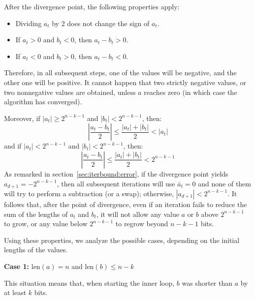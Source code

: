\documentclass{llncs}
\newcommand{\bitlength}{\text{len}}
\begin{document}
After the divergence point, the following properties apply:
\begin{itemize}

    \item Dividing $a_t$ by 2 does not change the sign of $a_t$.

    \item If $a_t > 0$ and $b_t < 0$, then $a_t - b_t > 0$.

    \item If $a_t < 0$ and $b_t > 0$, then $a_t - b_t < 0$.

\end{itemize}
Therefore, in all subsequent steps, one of the values will be negative,
and the other one will be positive. It cannot happen that two strictly
negative values, or two nonnegative values are obtained, unless $a$
reaches zero (in which case the algorithm has converged).

Moreover, if $|a_t| \geq 2^{n-k-1}$ and $|b_t| < 2^{n-k-1}$, then:
\begin{equation*}
    \left| \frac{a_t - b_t}{2} \right| \leq \frac{|a_t| + |b_t|}{2} < |a_t|
\end{equation*}
and if $|a_t| < 2^{n-k-1}$ and $|b_t| < 2^{n-k-1}$, then:
\begin{equation*}
    \left| \frac{a_t - b_t}{2} \right| \leq \frac{|a_t| + |b_t|}{2} < 2^{n-k-1}
\end{equation*}
As remarked in section~\ref{sec:iterbound:error}, if the divergence
point yields $a_{d+1} = -2^{n-k-1}$, then all subsequent iterations will
use $\bar a_t = 0$ and none of them will try to perform a subtraction
(or a swap); otherwise, $|a_{d+1}| < 2^{n-k-1}$. It follows that, after
the point of divergence, even if an iteration fails to reduce the sum
of the lengths of $a_t$ and $b_t$, it will not allow any value $a$ or
$b$ above $2^{n-k-1}$ to grow, or any value below $2^{n-k-1}$ to regrow
beyond $n-k-1$ bits.

Using these properties, we analyze the possible cases, depending
on the initial lengths of the values.

\vspace{2ex}
\noindent\textsf{\textbf{Case 1:}} $\bitlength(a) = n$ and
$\bitlength(b) \leq n-k$

This situation means that, when starting the inner loop, $b$ was shorter
than $a$ by at least $k$ bits.
\end{document}
